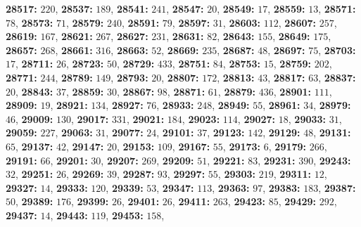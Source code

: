 \textsf{\bfseries 28517:} $220$, \textsf{\bfseries 28537:} $189$, \textsf{\bfseries 28541:} $241$, \textsf{\bfseries 28547:} $20$, \textsf{\bfseries 28549:} $17$, \textsf{\bfseries 28559:} $13$, \textsf{\bfseries 28571:} $78$, \textsf{\bfseries 28573:} $71$, \textsf{\bfseries 28579:} $240$, \textsf{\bfseries 28591:} $79$, \textsf{\bfseries 28597:} $31$, \textsf{\bfseries 28603:} $112$, \textsf{\bfseries 28607:} $257$, \textsf{\bfseries 28619:} $167$, \textsf{\bfseries 28621:} $267$, \textsf{\bfseries 28627:} $231$, \textsf{\bfseries 28631:} $82$, \textsf{\bfseries 28643:} $155$, \textsf{\bfseries 28649:} $175$, \textsf{\bfseries 28657:} $268$, \textsf{\bfseries 28661:} $316$, \textsf{\bfseries 28663:} $52$, \textsf{\bfseries 28669:} $235$, \textsf{\bfseries 28687:} $48$, \textsf{\bfseries 28697:} $75$, \textsf{\bfseries 28703:} $17$, \textsf{\bfseries 28711:} $26$, \textsf{\bfseries 28723:} $50$, \textsf{\bfseries 28729:} $433$, \textsf{\bfseries 28751:} $84$, \textsf{\bfseries 28753:} $15$, \textsf{\bfseries 28759:} $202$, \textsf{\bfseries 28771:} $244$, \textsf{\bfseries 28789:} $149$, \textsf{\bfseries 28793:} $20$, \textsf{\bfseries 28807:} $172$, \textsf{\bfseries 28813:} $43$, \textsf{\bfseries 28817:} $63$, \textsf{\bfseries 28837:} $20$, \textsf{\bfseries 28843:} $37$, \textsf{\bfseries 28859:} $30$, \textsf{\bfseries 28867:} $98$, \textsf{\bfseries 28871:} $61$, \textsf{\bfseries 28879:} $436$, \textsf{\bfseries 28901:} $111$, \textsf{\bfseries 28909:} $19$, \textsf{\bfseries 28921:} $134$, \textsf{\bfseries 28927:} $76$, \textsf{\bfseries 28933:} $248$, \textsf{\bfseries 28949:} $55$, \textsf{\bfseries 28961:} $34$, \textsf{\bfseries 28979:} $46$, \textsf{\bfseries 29009:} $130$, \textsf{\bfseries 29017:} $331$, \textsf{\bfseries 29021:} $184$, \textsf{\bfseries 29023:} $114$, \textsf{\bfseries 29027:} $18$, \textsf{\bfseries 29033:} $31$, \textsf{\bfseries 29059:} $227$, \textsf{\bfseries 29063:} $31$, \textsf{\bfseries 29077:} $24$, \textsf{\bfseries 29101:} $37$, \textsf{\bfseries 29123:} $142$, \textsf{\bfseries 29129:} $48$, \textsf{\bfseries 29131:} $65$, \textsf{\bfseries 29137:} $42$, \textsf{\bfseries 29147:} $20$, \textsf{\bfseries 29153:} $109$, \textsf{\bfseries 29167:} $55$, \textsf{\bfseries 29173:} $6$, \textsf{\bfseries 29179:} $266$, \textsf{\bfseries 29191:} $66$, \textsf{\bfseries 29201:} $30$, \textsf{\bfseries 29207:} $269$, \textsf{\bfseries 29209:} $51$, \textsf{\bfseries 29221:} $83$, \textsf{\bfseries 29231:} $390$, \textsf{\bfseries 29243:} $32$, \textsf{\bfseries 29251:} $26$, \textsf{\bfseries 29269:} $39$, \textsf{\bfseries 29287:} $93$, \textsf{\bfseries 29297:} $55$, \textsf{\bfseries 29303:} $219$, \textsf{\bfseries 29311:} $12$, \textsf{\bfseries 29327:} $14$, \textsf{\bfseries 29333:} $120$, \textsf{\bfseries 29339:} $53$, \textsf{\bfseries 29347:} $113$, \textsf{\bfseries 29363:} $97$, \textsf{\bfseries 29383:} $183$, \textsf{\bfseries 29387:} $50$, \textsf{\bfseries 29389:} $176$, \textsf{\bfseries 29399:} $26$, \textsf{\bfseries 29401:} $26$, \textsf{\bfseries 29411:} $263$, \textsf{\bfseries 29423:} $85$, \textsf{\bfseries 29429:} $292$, \textsf{\bfseries 29437:} $14$, \textsf{\bfseries 29443:} $119$, \textsf{\bfseries 29453:} $158$, 
